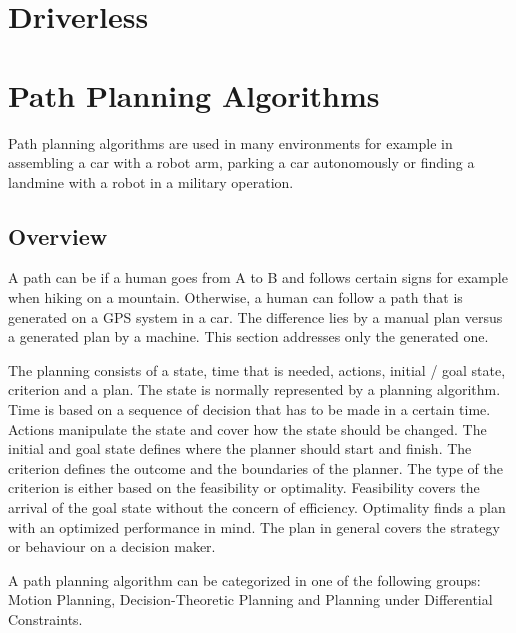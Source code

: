 \section{Driverless}
\lipsum[1]

\section{Path Planning Algorithms}
Path planning algorithms are used in many environments for example in assembling a car with a robot arm, parking a car autonomously or finding a landmine with a robot in a military operation. 

\subsection{Overview}
A path can be if a human goes from A to B and follows certain signs for example when hiking on a mountain. Otherwise, a human can follow a path that is generated on a GPS system in a car. The difference lies by a manual plan versus a generated plan by a machine. This section addresses only the generated one.

The planning consists of a state, time that is needed, actions, initial / goal state, criterion and a plan. The state is normally represented by a planning algorithm. Time is based on a sequence of decision that has to be made in a certain time. Actions manipulate the state and cover how the state should be changed. The initial and goal state defines where the planner should start and finish.
The criterion defines the outcome and the boundaries of the planner. The type of the criterion is either based on the feasibility or optimality. Feasibility covers the arrival of the goal state without the concern of efficiency. Optimality finds a plan with an optimized performance in mind. The plan in general covers the strategy or behaviour on a decision maker. \cite{planning_algorithms_steven_m_lavalle}

A path planning algorithm can be categorized in one of the following groups: Motion Planning, Decision-Theoretic Planning and Planning under Differential Constraints.
\cite{planning_algorithms_steven_m_lavalle}

